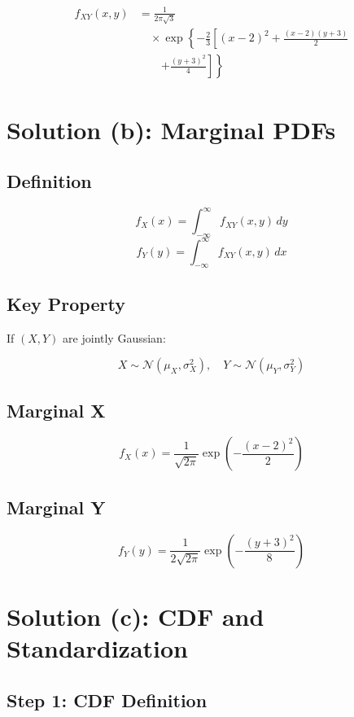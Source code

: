 \documentclass[12pt]{article}
\begin{document}
\[
\begin{aligned}
f_{XY}(x,y) &=
\frac{1}{2\pi\sqrt{3}} \\
&\quad \times \exp \left\{
-\frac{2}{3}
\left[
(x-2)^2
+
\frac{(x-2)(y+3)}{2}
\right.\right. \\
&\qquad \left.\left.
+
\frac{(y+3)^2}{4}
\right]
\right\}
\end{aligned}
\]

\section*{Solution (b): Marginal PDFs}

\subsection*{Definition}

\[
f_X(x) = \int_{-\infty}^{\infty} f_{XY}(x,y)\,dy
\]
\[
f_Y(y) = \int_{-\infty}^{\infty} f_{XY}(x,y)\,dx
\]

\subsection*{Key Property}

If $(X, Y)$ are jointly Gaussian:

\[
X \sim \mathcal{N}(\mu_X, \sigma_X^2), \quad
Y \sim \mathcal{N}(\mu_Y, \sigma_Y^2)
\]

\subsection*{Marginal X}

\[
f_X(x) =
\frac{1}{\sqrt{2\pi}}
\exp\left(-\frac{(x-2)^2}{2}\right)
\]

\subsection*{Marginal Y}

\[
f_Y(y) =
\frac{1}{2\sqrt{2\pi}}
\exp\left(-\frac{(y+3)^2}{8}\right)
\]

\section*{Solution (c): CDF and Standardization}

\subsection*{Step 1: CDF Definition}
\end{document}
